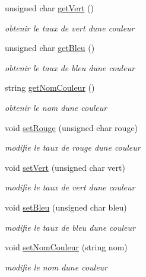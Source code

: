 \begin{DoxyCompactItemize}
unsigned char \hyperlink{classCouleur_a165899bdcc10fa60c10eed596ebcb682}{get\+Vert} ()
\begin{DoxyCompactList}\small\item\em obtenir le taux de vert d\textquotesingle{}une couleur \end{DoxyCompactList}\item 
unsigned char \hyperlink{classCouleur_aef20822658bc4a2fd3756b8ed15e02b7}{get\+Bleu} ()
\begin{DoxyCompactList}\small\item\em obtenir le taux de bleu d\textquotesingle{}une couleur \end{DoxyCompactList}\item 
string \hyperlink{classCouleur_a28d35bd6349451ced6b27b06d2a4d429}{get\+Nom\+Couleur} ()
\begin{DoxyCompactList}\small\item\em obtenir le nom d\textquotesingle{}une couleur \end{DoxyCompactList}\item 
void \hyperlink{classCouleur_a8cc9d92d1bf32803c04f5e4ebf314ab4}{set\+Rouge} (unsigned char rouge)
\begin{DoxyCompactList}\small\item\em modifie le taux de rouge d\textquotesingle{}une couleur \end{DoxyCompactList}\item 
void \hyperlink{classCouleur_a7b147a8bf7661866053918c2d4d3cf60}{set\+Vert} (unsigned char vert)
\begin{DoxyCompactList}\small\item\em modifie le taux de vert d\textquotesingle{}une couleur \end{DoxyCompactList}\item 
void \hyperlink{classCouleur_a639e3e3a6b86ed8e2e9ab0e73bff23fe}{set\+Bleu} (unsigned char bleu)
\begin{DoxyCompactList}\small\item\em modifie le taux de bleu d\textquotesingle{}une couleur \end{DoxyCompactList}\item 
void \hyperlink{classCouleur_a92ac934fb56448af9d2ddba17e23ec13}{set\+Nom\+Couleur} (string nom)
\begin{DoxyCompactList}\small\item\em modifie le nom d\textquotesingle{}une couleur \end{DoxyCompactList}\end{DoxyCompactItemize}


